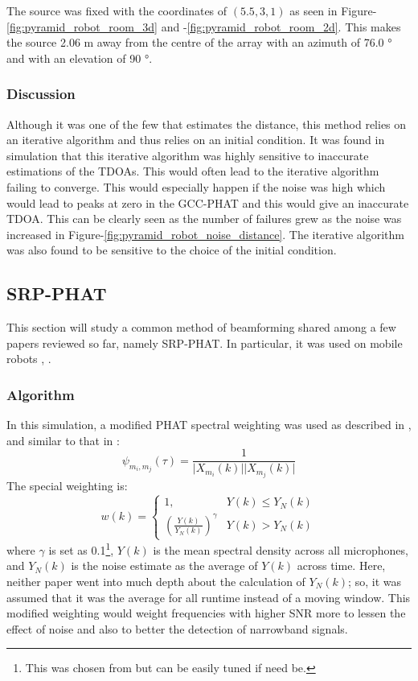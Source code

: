 \documentclass[notitlepage]{report}
\begin{document}
The source was fixed with the coordinates of $(5.5,3,1)$ as seen in Figure-\ref{fig:pyramid_robot_room_3d} and -\ref{fig:pyramid_robot_room_2d}. This makes the source 2.06 \si{m} away from the centre of the array with an azimuth of 76.0 \si{\degree} and with an elevation of 90 \si{\degree}.

\subsubsection{Discussion}

Although it was one of the few that estimates the distance, this method relies on an iterative algorithm and thus relies on an initial condition. It was found in simulation that this iterative algorithm was highly sensitive to inaccurate estimations of the TDOAs. This would often lead to the iterative algorithm failing to converge. This would especially happen if the noise was high which would lead to peaks at zero in the GCC-PHAT and this would give an inaccurate TDOA. This can be clearly seen as the number of failures grew as the noise was increased in Figure-\ref{fig:pyramid_robot_noise_distance}. The iterative algorithm was also found to be sensitive to the choice of the initial condition.

\subsection{SRP-PHAT} \label{SRP_PHAT}

This section will study a common method of beamforming shared among a few papers reviewed so far, namely SRP-PHAT. In particular, it was used on mobile robots \cite{valin_localization_2004}, \cite{valin_robust_2007}.

\subsubsection{Algorithm}

In this simulation, a modified PHAT spectral weighting was used as described in \cite{valin_localization_2004}, and similar to that in \cite{valin_robust_2003}:
\begin{equation}
\psi_{m_i,m_j}(\tau) = \frac{1}{\lvert X_{m_i}(k) \rvert \lvert X_{m_j}(k) \rvert}
\end{equation}
The special weighting is:
\begin{equation}
w(k) =
\begin{cases}
	1,										& Y(k) \leq Y_N(k) \\
	\left( \frac{Y(k)}{Y_N(k)}\right)^\gamma	& Y(k) > Y_N(k)
\end{cases}
\end{equation}
where $\gamma$ is set as 0.1\footnote{This was chosen from \cite{valin_localization_2004} but can be easily tuned if need be.}, $Y(k)$ is the mean spectral density across all microphones, and $Y_N(k)$ is the noise estimate as the average of $Y(k)$ across time. Here, neither paper went into much depth about the calculation of $Y_N(k)$; so, it was assumed that it was the average for all runtime instead of a moving window. This modified weighting would weight frequencies with higher SNR more to lessen the effect of noise and also to better the detection of narrowband signals.
\end{document}
